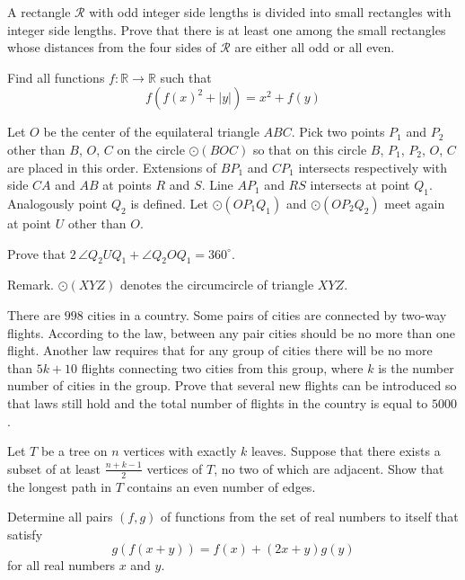 \documentclass[11pt]{scrartcl}
\begin{document}
\begin{problem}[514046395982396]
A rectangle $\mathcal{R}$ with odd integer side lengths is divided into small rectangles with integer side lengths. Prove that there is at least one among the small rectangles whose distances from the four sides of $\mathcal{R}$ are either all odd or all even.
\end{problem}
\begin{problem}[514210607042538]
Find all functions $f : \mathbb{R} \to \mathbb{R}$ such that
$$f(f(x)^2 + |y|) = x^2 + f(y)$$
\end{problem}
\begin{problem}[518384374486289]
	Let $O$ be the center of the equilateral triangle $ABC$. Pick two points $P_1$ and $P_2$ other than $B$, $O$, $C$ on the circle $\odot(BOC)$ so that on this circle $B$, $P_1$, $P_2$, $O$, $C$ are placed in this order. Extensions of $BP_1$ and $CP_1$ intersects respectively with side $CA$ and $AB$ at points $R$ and $S$. Line $AP_1$ and $RS$ intersects at point $Q_1$. Analogously point $Q_2$ is defined. Let $\odot(OP_1Q_1)$ and $\odot(OP_2Q_2)$ meet again at point $U$ other than $O$.

Prove that $2\,\angle Q_2UQ_1 + \angle Q_2OQ_1 = 360^\circ$.

Remark. $\odot(XYZ)$ denotes the circumcircle of triangle $XYZ$.
\end{problem}
\begin{problem}[521339998508550]
There are $998$ cities in a country. Some pairs of cities are connected by two-way flights. According to the law, between any pair cities should be no more than one flight. Another law requires that for any group of cities there will be no more than $5k+10$ flights connecting two cities from this group, where $k$ is the number number of cities in the group. Prove that several new flights can be introduced so that laws still hold and the total number of flights in the country is equal to $5000$.
\end{problem}
\begin{problem}[521969466382456]
	Let $T$ be a tree on $n$ vertices with exactly $k$ leaves. Suppose that there exists a subset of at least $\frac{n+k-1}{2}$ vertices of $T$, no two of which are adjacent. Show that the longest path in $T$ contains an even number of edges. 
\end{problem}
\begin{problem}[522601446762373]
Determine all pairs $(f,g)$ of functions from the set of real numbers to itself that satisfy\[g(f(x+y)) = f(x) + (2x + y)g(y)\]for all real numbers $x$ and $y$.
\end{problem}
\end{document}
